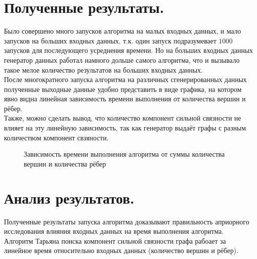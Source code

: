 \documentclass[oneside,final,14pt]{extreport}
\begin{document}
\section{Полученные результаты.}
\noindent
Было совершено много запусков алгоритма на малых входных данных, и мало
запусков на больших входных данных, т.к. один запуск подразумевает $1000$ 
запусков для последующего усреднения времени. Но на больших входных данных
генератор данных работал намного дольше самого алгоритма, что и вызывало
такое мелое количество результатов на больших входных данных.\\
После многократного запуска алгоритма на различных сгенерированных данных 
полученные выходные данные удобно представить в виде графика, на котором
явно видна линейная зависимость времени выполнения от количества вершин и
рёбер.\\
Также, можно сделать вывод, что количество компонент сильной связности не
влияет на эту линейную зависимость, так как генератор выдаёт графы с разным
количеством компонент свзяности.\\
\begin{figure}[h]
    \caption{Зависимость времени выполнения алгоритма от суммы количества 
    вершин и количества рёбер}
\end{figure}

\newpage
\section{Анализ результатов.}
\noindent
Полученные результаты запуска алгоритма доказывают правильность априорного
исследования влияния входных данных на время выполнения алгоритма.\\
Алгоритм
Тарьяна поиска компонент сильной связности графа рабоает за линейное время
относительно входных данных (количество вершин и рёбер).\\
\end{document}
